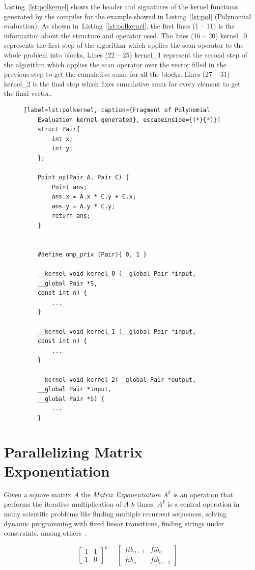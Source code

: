 \documentclass[Ingles]{ic-tese-v1}
\newcommand{\rlst}[1]{Listing~\ref{lst:#1}}
\begin{document}
\rlst{polkernel} shows the header and signatures of the kernel
functions  generated  by  the  compiler  for  the  example  showed  in
\rlst{pol} (Polynomial evaluation). As  shown in~\rlst{polkernel}, the first lines (1 -- 11) is the information
about the structure and operator used. The lines (16 -- 20) kernel\_0 represents the first step of the algorithm
which applies the scan operator to the whole problem into blocks,
Lines (22 -- 25) kernel\_1 represent the second step of the algorithm   which  applies the scan operator
over the vector filled in the previous step to get the cumulative sums for all the blocks.
Lines (27 -- 31) kernel\_2 is the final step which fixes cumulative sums
for every element to get the final vector.

\begin{figure}[t]
	\lstset{basicstyle=\scriptsize}
	\begin{lstlisting}[label=lst:polkernel, caption={Fragment of Polynomial
	Evaluation kernel generated}, escapeinside={(*}{*)}]
	struct Pair{
		int x;
		int y;
	};

	Point op(Pair A, Pair C) {
		Point ans;
		ans.x = A.x * C.y + C.x;
		ans.y = A.y * C.y;
		return ans;
	}


	#define omp_priv (Pair){ 0, 1 }

	__kernel void kernel_0 (__global Pair *input,
	__global Pair *S,
	const int n) {
		...
	}

	__kernel void kernel_1 (__global Pair *input,
	const int n) {
		...
	}

	__kernel void kernel_2(__global Pair *output,
	__global Pair *input,
	__global Pair *S) {
		...
	}
	\end{lstlisting}
\end{figure}

\section{Parallelizing Matrix Exponentiation}
\label{sec:fibonacci}

Given a square matrix $A$ the \textit{Matrix Exponentiation} $A^k$ is an operation
that performs the iterative multiplication of $A$ $k$ times. $A^k$ is a central
operation in many scientific problems like finding multiple recurrent sequences,
solving dynamic programming with fixed linear transitions, finding strings under
constraints, among others~\cite{doi:10}.

\begin{equation}
\begin{bmatrix}1 & 1 \\ 1 & 0\end{bmatrix}^{n}
= \begin{bmatrix}fib_{n+1} & fib_{n}\\fib_{n} &
fib_{n-1}\end{bmatrix}
\label{eq:fib}
\end{equation}
\end{document}
